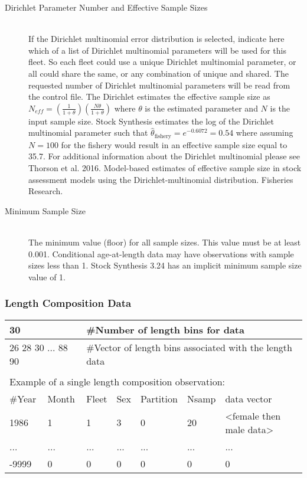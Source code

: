 \begin{description}
	\item[Dirichlet Parameter Number and Effective Sample Sizes]\hfill\\
	If the Dirichlet multinomial error distribution is selected, indicate here which of a list of Dirichlet multinomial parameters will be used for this fleet.  So each fleet could use a unique Dirichlet multinomial parameter, or all could share the same, or any combination of unique and shared.  The requested number of Dirichlet multinomial parameters will be read from the control file.  The Dirichlet estimates the effective sample size as $N_{eff}=(\frac{1}{1+\theta})(\frac{N\theta}{1+\theta})$ where $\theta$ is the estimated parameter and $N$ is the input sample size.  Stock Synthesis estimates the log of the Dirichlet multinomial parameter such that $\hat{\theta}_{\text{fishery}} = e^{-0.6072} = 0.54$ where assuming $N=100$ for the fishery would result in an effective sample size equal to 35.7.  For additional information about the Dirichlet multinomial please see Thorson et al. 2016. Model-based estimates of effective sample size in stock assessment models using the Dirichlet-multinomial distribution. Fisheries Research.

	\item[Minimum Sample Size]\hfill\\
	The minimum value (floor) for all sample sizes. This value must be at least 0.001. Conditional age-at-length data may have observations with sample sizes less than 1. Stock Synthesis 3.24 has an implicit minimum sample size value of 1.
\end{description}

\hypertarget{CompTiming}{}
\subsubsection{Length Composition Data}
\begin{center}
	\begin{tabular}{p{1.5cm} p{1.5cm} p{1.5cm} p{1.5cm} p{1.5cm} p{1.5cm} p{5cm}}
		\hline
		\multicolumn{2}{l}{30} & \multicolumn{5}{l}{\#Number of length bins for data}\\
		\hline
		\multicolumn{2}{l}{26 28 30 ... 88 90} &  \multicolumn{5}{l}{\#Vector of length bins associated with the length data}\\
		\hline
		\\
		\multicolumn{7}{l}{Example of a single length composition observation:} \\
		\hline
		\#Year & Month & Fleet & Sex & Partition & Nsamp & data vector\\
		\hline
		1986 & 1 & 1 & 3 & 0 & 20 & <female then male data> \\
		... & ...& ... & ... & ...& ... & ... \\
		-9999 & 0 & 0 & 0 & 0 & 0 & 0 \\
		\hline	
	\end{tabular}
\end{center}

